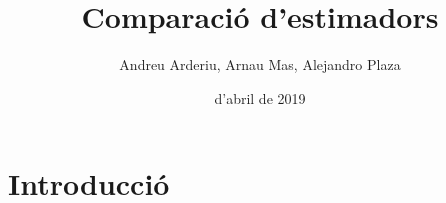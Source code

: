 \documentclass[12pt]{article}
\title{\sffamily {\bfseries Entrega 2:} Comparació d'estimadors}
\author{\sffamily Andreu Arderiu, Arnau Mas, Alejandro Plaza}
\date{\sffamily 25 d'abril de 2019}
\begin{document}
\maketitle

\section{Introducció}
\end{document}
